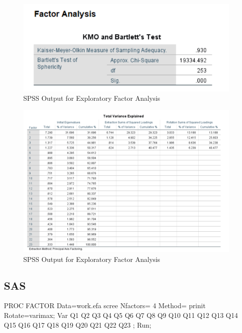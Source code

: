 \documentclass[
]{book}
\newenvironment{Shaded}{\begin{snugshade}}{\end{snugshade}}
\newcommand{\DecValTok}[1]{\textcolor[rgb]{0.00,0.00,0.81}{#1}}
\newcommand{\NormalTok}[1]{#1}
\newcommand{\StringTok}[1]{\textcolor[rgb]{0.31,0.60,0.02}{#1}}
\begin{document}
\begin{figure}[!h]
\includegraphics{Screenshots/Exploratory Factor Analysis/efaSPSS1} \caption{\label{fig:efaSPSS}SPSS Output for Exploratory Factor Analysis}\label{fig:efaSPSS}
\end{figure}

\begin{figure}[!h]
\includegraphics{Screenshots/Exploratory Factor Analysis/efaSPSS2} \caption{\label{fig:efaSPSS2}SPSS Output for Exploratory Factor Analysis}\label{fig:efaSPSS2}
\end{figure}

\hypertarget{sas-1}{%
\subsection{SAS}\label{sas-1}}

\begin{Shaded}
\begin{Highlighting}[]
\NormalTok{PROC FACTOR Data=work.efa scree}
\NormalTok{		Nfactors=}\StringTok{ }\DecValTok{4}
\NormalTok{		Method=}\StringTok{ }\NormalTok{prinit}
\NormalTok{		Rotate=varimax;}
\NormalTok{		Var Q1 Q2 Q3 Q4 Q5 Q6 Q7 Q8 Q9 Q10 Q11 Q12 Q13 Q14 Q15 Q16 Q17 Q18 Q19 Q20 Q21 Q22 Q23}
\NormalTok{		; }
\NormalTok{		Run;}
\end{Highlighting}
\end{Shaded}
\end{document}

